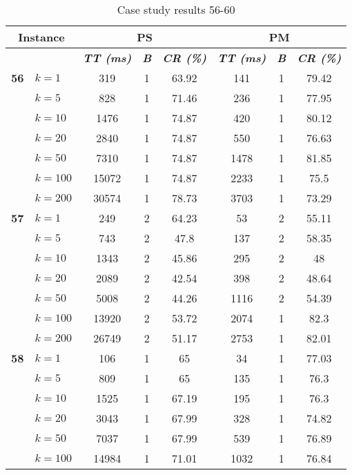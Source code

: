     \begin{table}[htbp]
    \caption{Case study results 56-60}
    \centering
    \begin{tabular}{|l|l|c|c|c|c|c|c|}
    \hline
    \multicolumn{ 2}{|c|}{\textbf{Instance}} & \multicolumn{ 3}{c|}{\textbf{PS}} & \multicolumn{ 3}{c|}{\textbf{PM}} \\ \hline
    \multicolumn{ 2}{|l|}{} & \textbf{\textit{TT (ms)}} & \textbf{\textit{B}} & \textbf{\textit{CR (\%)}} & \textbf{\textit{TT (ms)}} & \textbf{\textit{B}} & \textbf{\textit{CR (\%)}} \\ \hline
    \multicolumn{1}{|r|}{\textbf{56}} & $k=1$ & 319 & 1 & 63.92 & 141 & 1 & 79.42 \\ 
     & $k=5$ & 828 & 1 & 71.46 & 236 & 1 & 77.95 \\ 
     & $k=10$ & 1476 & 1 & 74.87 & 420 & 1 & 80.12 \\ 
     & $k=20$ & 2840 & 1 & 74.87 & 550 & 1 & 76.63 \\ 
     & $k=50$ & 7310 & 1 & 74.87 & 1478 & 1 & 81.85 \\ 
     & $k=100$ & 15072 & 1 & 74.87 & 2233 & 1 & 75.5 \\ 
     & $k=200$ & 30574 & 1 & 78.73 & 3703 & 1 & 73.29 \\ \hline
    \multicolumn{1}{|r|}{\textbf{57}} & $k=1$ & 249 & 2 & 64.23 & 53 & 2 & 55.11 \\ 
     & $k=5$ & 743 & 2 & 47.8 & 137 & 2 & 58.35 \\ 
     & $k=10$ & 1343 & 2 & 45.86 & 295 & 2 & 48 \\ 
     & $k=20$ & 2089 & 2 & 42.54 & 398 & 2 & 48.64 \\ 
     & $k=50$ & 5008 & 2 & 44.26 & 1116 & 2 & 54.39 \\ 
     & $k=100$ & 13920 & 2 & 53.72 & 2074 & 1 & 82.3 \\ 
     & $k=200$ & 26749 & 2 & 51.17 & 2753 & 1 & 82.01 \\ \hline
    \multicolumn{1}{|r|}{\textbf{58}} & $k=1$ & 106 & 1 & 65 & 34 & 1 & 77.03 \\ 
     & $k=5$ & 809 & 1 & 65 & 135 & 1 & 76.3 \\ 
     & $k=10$ & 1525 & 1 & 67.19 & 195 & 1 & 76.3 \\ 
     & $k=20$ & 3043 & 1 & 67.99 & 328 & 1 & 74.82 \\ 
     & $k=50$ & 7037 & 1 & 67.99 & 539 & 1 & 76.89 \\ 
     & $k=100$ & 14984 & 1 & 71.01 & 1032 & 1 & 76.84 \\ 

\end{tabular}
\end{table}

